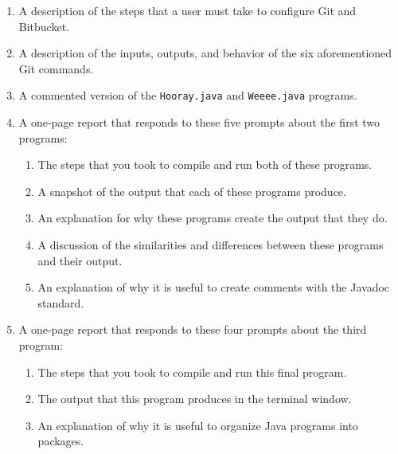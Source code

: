 \vspace*{-.05in}
\begin{enumerate}

  \itemsep 0em
  \item A description of the steps that a user must take to configure Git and Bitbucket.
  \item A description of the inputs, outputs, and behavior of the six aforementioned Git commands.
  \item A commented version of the {\tt Hooray.java} and {\tt Weeee.java} programs.

  \item A one-page report that responds to these five prompts about the first two programs:

    \vspace*{-.05in}
    \begin{enumerate}
      \itemsep 0em

      \item The steps that you took to compile and run both of these programs.

      \item A snapshot of the output that each of these programs produce.

      \item An explanation for why these programs create the output that they do.

      \item A discussion of the similarities and differences between these programs and their output.

      \item An explanation of why it is useful to create comments with the Javadoc standard.

    \end{enumerate}

  \item A one-page report that responds to these four prompts about the third program:

    \vspace*{-.05in}
    \begin{enumerate}
      \itemsep 0em

      \item The steps that you took to compile and run this final program.

      \item The output that this program produces in the terminal window.

      \item An explanation of why it is useful to organize Java programs into packages.


\end{enumerate}
\end{enumerate}
